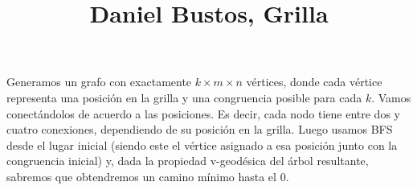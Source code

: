 \documentclass{article}
\title{Daniel Bustos, Grilla}
\author{}
\date{}
\begin{document}
\maketitle

Generamos un grafo con exactamente $k \times m \times n$ vértices, donde cada vértice representa una posición en la grilla y una congruencia posible para cada $k$. Vamos conectándolos de acuerdo a las posiciones. Es decir, cada nodo tiene entre dos y cuatro conexiones, dependiendo de su posición en la grilla. Luego usamos BFS desde el lugar inicial (siendo este el vértice asignado a esa posición junto con la congruencia inicial) y, dada la propiedad v-geodésica del árbol resultante, sabremos que obtendremos un camino mínimo hasta el $0$.
\end{document}
